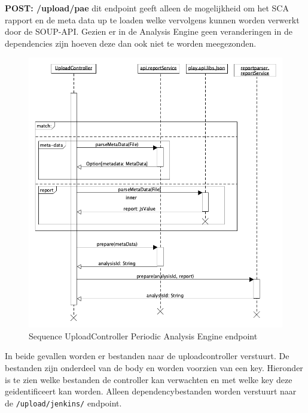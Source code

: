 \textbf{POST: /upload/pae} dit endpoint geeft alleen de mogelijkheid om het SCA rapport en de meta data up te loaden welke vervolgens kunnen worden verwerkt door de SOUP-API. Gezien er in de Analysis Engine geen veranderingen in de dependencies zijn hoeven deze dan ook niet te worden meegezonden.

\begin{figure}[bth]
    \myfloatalign
    \includegraphics[width=12cm]{gfx/umlet/exports/SequploadController-pae}
    \caption{Sequence UploadController Periodic Analysis Engine endpoint}
    \label{fig:SequenceUploadReportpaet}
\end{figure}

In beide gevallen worden er bestanden naar de uploadcontroller verstuurt. De bestanden zijn onderdeel van de body en worden voorzien van een key. Hieronder is te zien welke bestanden de controller kan verwachten en met welke key deze geidentificeert kan worden. Alleen dependencybestanden worden verstuurt naar de \texttt{/upload/jenkins/} endpoint.

